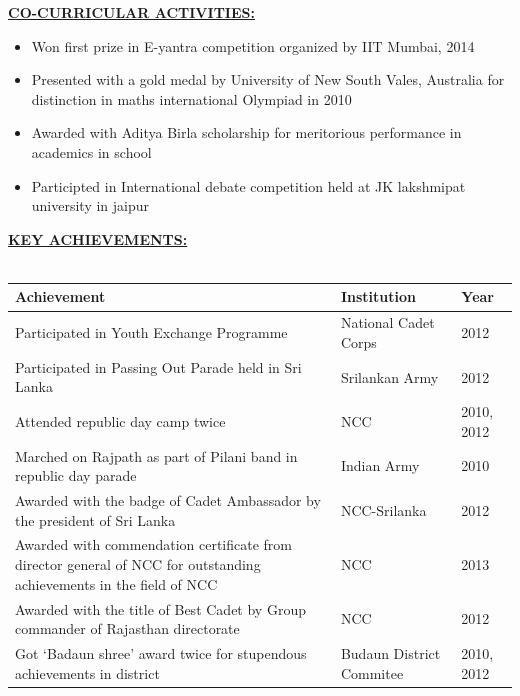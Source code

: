 \documentclass{article}
\begin{document}
				\underline{\textbf{CO-CURRICULAR ACTIVITIES:}}\\
				\begin{itemize}
					\item Won first prize in E-yantra competition organized by IIT Mumbai, 2014
					\item Presented with a gold medal by University of New South Vales, Australia for distinction in maths international Olympiad in 2010
					\item Awarded with Aditya Birla scholarship for meritorious performance in academics in school
					\item Participted in International debate competition held at JK lakshmipat university in jaipur
					\\[\baselineskip] 
				\end{itemize}
				\underline{\textbf{KEY ACHIEVEMENTS:}}\\
				\\
				\begin{tabular}{|p{6cm}|p{5cm}|p{4cm}|}
					\hline
					\textbf{Achievement} & \textbf{Institution} & \textbf{Year}\\
					\hline
					Participated in Youth Exchange Programme & National Cadet Corps & 2012 \\
					\hline
					Participated in Passing Out  Parade held in Sri Lanka & Srilankan Army & 2012 \\
					\hline
					Attended republic day camp  twice & NCC & 2010, 2012 \\
					\hline
					Marched on Rajpath as  part of Pilani band in republic day parade & Indian Army & 2010\\
					\hline
					Awarded with the badge of Cadet Ambassador by the president of Sri Lanka& NCC-Srilanka & 2012 \\
					\hline
					Awarded with  commendation certificate from director general of NCC for outstanding achievements in the field of NCC & NCC & 2013 \\
					\hline
					Awarded with the title of Best Cadet by Group commander of Rajasthan directorate & NCC & 2012 \\
					\hline
					Got ‘Badaun shree’ award twice for stupendous achievements in district & Budaun District Commitee & 2010, 2012 \\
					\hline
				\end{tabular}
				\\
				\\
				\\
\end{document}

